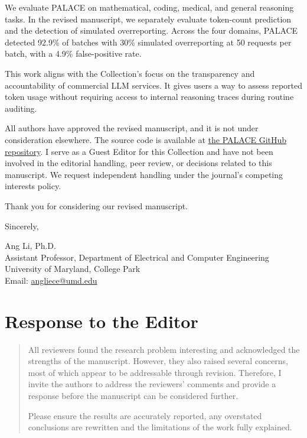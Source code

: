 \documentclass[11pt,letterpaper]{article}
\begin{document}
We evaluate PALACE on mathematical, coding, medical, and general reasoning tasks. In the revised manuscript, we separately evaluate token-count prediction and the detection of simulated overreporting. Across the four domains, PALACE detected 92.9\% of batches with 30\% simulated overreporting at 50 requests per batch, with a 4.9\% false-positive rate.

This work aligns with the Collection's focus on the transparency and accountability of commercial LLM services. It gives users a way to assess reported token usage without requiring access to internal reasoning traces during routine auditing.

All authors have approved the revised manuscript, and it is not under consideration elsewhere. The source code is available at \href{https://github.com/ziyaow1010/Reasoning_Length_Prediction}{the PALACE GitHub repository}. I serve as a Guest Editor for this Collection and have not been involved in the editorial handling, peer review, or decisions related to this manuscript. We request independent handling under the journal's competing interests policy.

Thank you for considering our revised manuscript.

Sincerely,\par
\vspace*{0.48in}
Ang Li, Ph.D.\\
Assistant Professor, Department of Electrical and Computer Engineering\\
University of Maryland, College Park\\
Email: \href{mailto:angliece@umd.edu}{angliece@umd.edu}

\clearpage
\vspace*{0.45in}
\section*{Response to the Editor}
\begin{quote}\small
All reviewers found the research problem interesting and acknowledged the strengths of the manuscript. However, they also raised several concerns, most of which appear to be addressable through revision. Therefore, I invite the authors to address the reviewers' comments and provide a response before the manuscript can be considered further.
\par
Please ensure the results are accurately reported, any overstated conclusions are rewritten and the limitations of the work fully explained.
\end{quote}
\end{document}
